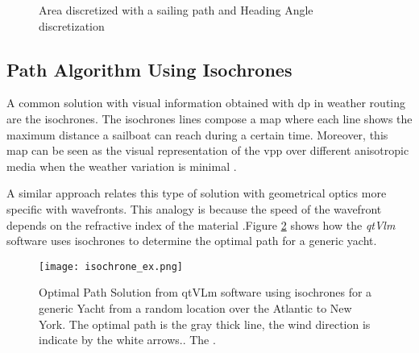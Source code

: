 
\begin{figure} [hbt!]
  \centering
  \hfill 
  \hfill
  \caption{Area discretized with a sailing path and Heading Angle discretization}
\label{fig:AreaDiscret} 
\end{figure}

\subsection{Path Algorithm Using Isochrones} \label{sec:isochrones}
A common solution with visual information obtained with \acrshort{dp} in weather routing are the isochrones. The isochrones lines compose a map where each line shows the maximum distance a sailboat can reach during a certain time. Moreover, this map can be seen as the visual representation of the \acrshort{vpp} over different anisotropic media when the weather variation is minimal \cite{allsopp1998stochastic}. \par 
A similar approach relates this type of solution with geometrical optics more specific with wavefronts. This analogy is because the speed of the wavefront depends on the refractive index of the material \cite{rabaudoptimal}.Figure \ref{fig:isochrone_ex} shows how the \textit{qtVlm} software uses isochrones to determine the optimal path for a generic yacht.\par

\begin{figure}[hbt!]
    \centering
    \texttt{[image: isochrone\_ex.png]}
    \caption{Optimal Path Solution from qtVLm software using isochrones for a generic Yacht from a random location over the Atlantic to New York. The optimal path is the gray thick line, the wind direction is indicate by the white arrows.. The \cite{rabaudoptimal}. }
    \label{fig:isochrone_ex}
\end{figure}

